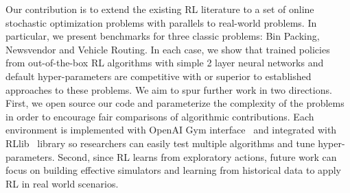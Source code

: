 \documentclass{article}
\begin{document}

Our contribution is to extend the existing RL literature to a set of online stochastic optimization problems with parallels to real-world problems. In particular, we present benchmarks for three classic problems: Bin Packing, Newsvendor and Vehicle Routing.  In each case, we show that trained policies from out-of-the-box RL algorithms with simple 2 layer neural networks and default hyper-parameters are competitive with or superior to established approaches to these problems. 
We aim to spur further work in two directions.  First, we open source our code and parameterize the complexity of the problems in order to encourage fair comparisons of algorithmic contributions.  Each environment is implemented with OpenAI Gym interface~\cite{brockman2016openai} and integrated with RLlib~\cite{liang2017rllib} library so researchers can easily test multiple algorithms and tune hyper-parameters. %
Second, since RL learns from exploratory actions, future work can focus on building effective simulators and learning from historical data to apply RL in real world scenarios.


\end{document}
